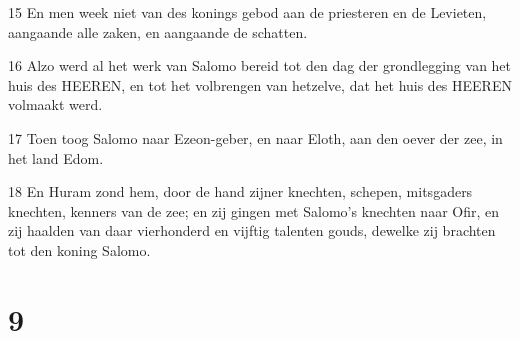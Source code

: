 \par 15 En men week niet van des konings gebod aan de priesteren en de Levieten, aangaande alle zaken, en aangaande de schatten.
\par 16 Alzo werd al het werk van Salomo bereid tot den dag der grondlegging van het huis des HEEREN, en tot het volbrengen van hetzelve, dat het huis des HEEREN volmaakt werd.
\par 17 Toen toog Salomo naar Ezeon-geber, en naar Eloth, aan den oever der zee, in het land Edom.
\par 18 En Huram zond hem, door de hand zijner knechten, schepen, mitsgaders knechten, kenners van de zee; en zij gingen met Salomo's knechten naar Ofir, en zij haalden van daar vierhonderd en vijftig talenten gouds, dewelke zij brachten tot den koning Salomo.

\chapter{9}

